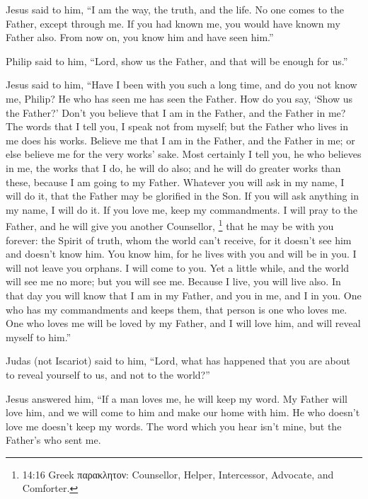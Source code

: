  Jesus said to him, ``I am the way, the truth, and the life.
No one comes to the Father, except through me.  If you had
known me, you would have known my Father also. From now on, you know him
and have seen him.''

 Philip said to him, ``Lord, show us the Father, and that
will be enough for us.''

 Jesus said to him, ``Have I been with you such a long time,
and do you not know me, Philip? He who has seen me has seen the Father.
How do you say, `Show us the Father?'  Don't you believe
that I am in the Father, and the Father in me? The words that I tell
you, I speak not from myself; but the Father who lives in me does his
works.  Believe me that I am in the Father, and the Father
in me; or else believe me for the very works' sake.  Most
certainly I tell you, he who believes in me, the works that I do, he
will do also; and he will do greater works than these, because I am
going to my Father.  Whatever you will ask in my name, I
will do it, that the Father may be glorified in the Son. 
If you will ask anything in my name, I will do it.  If you
love me, keep my commandments.  I will pray to the Father,
and he will give you another Counsellor, \footnote{14:16 Greek
  παρακλητον: Counsellor, Helper, Intercessor, Advocate, and Comforter.}
that he may be with you forever:  the Spirit of truth, whom
the world can't receive, for it doesn't see him and doesn't know him.
You know him, for he lives with you and will be in you.  I
will not leave you orphans. I will come to you.  Yet a
little while, and the world will see me no more; but you will see me.
Because I live, you will live also.  In that day you will
know that I am in my Father, and you in me, and I in you. 
One who has my commandments and keeps them, that person is one who loves
me. One who loves me will be loved by my Father, and I will love him,
and will reveal myself to him.''

 Judas (not Iscariot) said to him, ``Lord, what has
happened that you are about to reveal yourself to us, and not to the
world?''

 Jesus answered him, ``If a man loves me, he will keep my
word. My Father will love him, and we will come to him and make our home
with him.  He who doesn't love me doesn't keep my words.
The word which you hear isn't mine, but the Father's who sent me.

